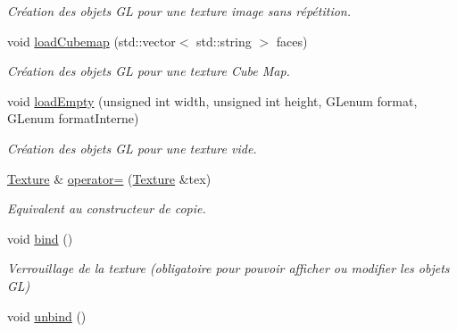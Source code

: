 \begin{DoxyCompactItemize}
\begin{DoxyCompactList}\small\item\em Création des objets G\+L pour une texture image sans répétition. \end{DoxyCompactList}\item 
\hypertarget{classTexture_a006028bb4f1c28b731260ce24a7ba263}{void \hyperlink{classTexture_a006028bb4f1c28b731260ce24a7ba263}{load\+Cubemap} (std\+::vector$<$ std\+::string $>$ faces)}\label{classTexture_a006028bb4f1c28b731260ce24a7ba263}

\begin{DoxyCompactList}\small\item\em Création des objets G\+L pour une texture Cube Map. \end{DoxyCompactList}\item 
\hypertarget{classTexture_a041fd824a637b8c02df9564cb96ee53e}{void \hyperlink{classTexture_a041fd824a637b8c02df9564cb96ee53e}{load\+Empty} (unsigned int width, unsigned int height, G\+Lenum format, G\+Lenum format\+Interne)}\label{classTexture_a041fd824a637b8c02df9564cb96ee53e}

\begin{DoxyCompactList}\small\item\em Création des objets G\+L pour une texture vide. \end{DoxyCompactList}\item 
\hypertarget{classTexture_a18a767fcb0c2648f5c4f3bbc6ac06fc5}{\hyperlink{classTexture}{Texture} \& \hyperlink{classTexture_a18a767fcb0c2648f5c4f3bbc6ac06fc5}{operator=} (\hyperlink{classTexture}{Texture} \&tex)}\label{classTexture_a18a767fcb0c2648f5c4f3bbc6ac06fc5}

\begin{DoxyCompactList}\small\item\em Equivalent au constructeur de copie. \end{DoxyCompactList}\item 
\hypertarget{classTexture_a3840dc7429982ffaddeafc8d62345b5d}{void \hyperlink{classTexture_a3840dc7429982ffaddeafc8d62345b5d}{bind} ()}\label{classTexture_a3840dc7429982ffaddeafc8d62345b5d}

\begin{DoxyCompactList}\small\item\em Verrouillage de la texture (obligatoire pour pouvoir afficher ou modifier les objets G\+L) \end{DoxyCompactList}\item 
\hypertarget{classTexture_a8480eed7ed703a937c3e6ab528f559bd}{void \hyperlink{classTexture_a8480eed7ed703a937c3e6ab528f559bd}{unbind} ()}\label{classTexture_a8480eed7ed703a937c3e6ab528f559bd}


\end{DoxyCompactItemize}
